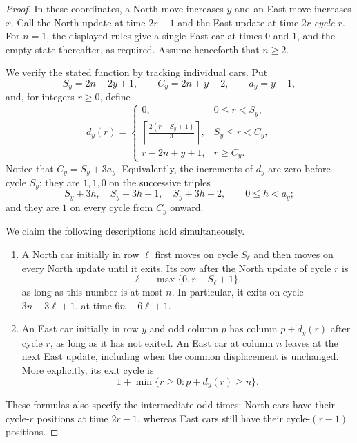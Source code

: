 \documentclass[reqno]{amsart}
\begin{document}
\begin{proof}
In these coordinates, a North move increases $y$ and an East move increases $x$.
Call the North update at time $2r-1$ and the East update at time $2r$
\emph{cycle $r$}. For $n=1$, the displayed rules give a single East car at
times $0$ and $1$, and the empty state thereafter, as required.
Assume henceforth that $n\geq2$.

We verify the stated function by tracking individual cars. Put
\[
    S_y=2n-2y+1,\qquad C_y=2n+y-2,\qquad a_y=y-1,
\]
and, for integers $r\geq0$, define
\begin{equation}\label{eq:alternating-displacement}
d_y(r)=
\begin{cases}
0, & 0\leq r<S_y,\\[2pt]
\displaystyle\left\lceil\frac{2(r-S_y+1)}{3}\right\rceil,
    & S_y\leq r<C_y,\\[6pt]
r-2n+y+1, & r\geq C_y.
\end{cases}
\end{equation}
Notice that $C_y=S_y+3a_y$. Equivalently, the increments of $d_y$ are
zero before cycle $S_y$; they are $1,1,0$ on the successive triples
\[
    S_y+3h,\quad S_y+3h+1,\quad S_y+3h+2,
    \qquad 0\leq h<a_y;
\]
and they are $1$ on every cycle from $C_y$ onward.

We claim the following descriptions hold simultaneously.
\begin{enumerate}
\item A North car initially in row $\ell$ first moves on cycle $S_\ell$
and then moves on every North update until it exits. Its row after the
North update of cycle $r$ is
\begin{equation}\label{eq:alternating-north-position}
    \ell+\max\{0,r-S_\ell+1\},
\end{equation}
as long as this number is at most $n$. In particular, it exits on cycle
$3n-3\ell+1$, at time $6n-6\ell+1$.
\item An East car initially in row $y$ and odd column $p$ has column
$p+d_y(r)$ after cycle $r$, as long as it has not exited. An East car
at column $n$ leaves at the next East update, including when the common
displacement is unchanged. More explicitly, its exit cycle is
\begin{equation}\label{eq:alternating-east-exit}
    1+\min\{r\geq0:p+d_y(r)\geq n\}.
\end{equation}
\end{enumerate}
These formulas also specify the intermediate odd times: North cars have
their cycle-$r$ positions at time $2r-1$, whereas East cars still have
their cycle-$(r-1)$ positions.


\end{proof}
\end{document}

